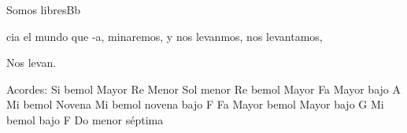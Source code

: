 \documentclass[12pt, spanish]{book}
\begin{document}
\begin{song}{Somos libres}{Bb}
\begin{SBOpGroup}
            cia el mundo que -a, minaremos, y nos levanmos, nos levantamos,

            Nos levan.
        \end{SBOpGroup}

        \ifChordBk
        \begin{SBOpGroup}
            Acordes:\null\break
            \upchord{\Bflat}\qquad Si bemol Mayor \hfill
            \upchord{\Dm}\qquad Re Menor \hfill\null\break
            \upchord{\Gm}Sol menor \hfill
            \upchord{\Eflat}Re bemol Mayor \hfill\null\break
            \upchord{\FA}Fa Mayor bajo A \hfill
            \upchord{\Eflatnine}Mi bemol Novena \hfill\null\break
            \upchord{\EflatnineC}Mi bemol novena bajo F \hfill
            \upchord{\F}\qquad Fa Mayor \hfill\null\break
             bemol Mayor bajo G \hfill
            \upchord{\EflatF}\qquad Mi bemol  bajo F \hfill\null\break
            \upchord{\Cmseven}Do menor s\'eptima \hfill\null\break
        \end{SBOpGroup}
        \fi
    \end{song}
\end{document}
